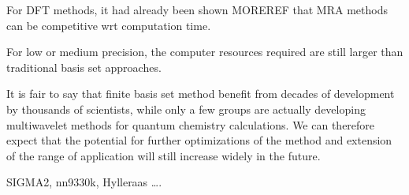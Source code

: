 \documentclass[%
 aip,
 amsmath,amssymb,
 reprint,%
]{revtex4-1}
\begin{document}

For DFT methods, it had already been shown \cite{bischoff2019} MOREREF that MRA methods can be competitive wrt computation time.

For low or medium precision, the computer resources required are still larger than traditional basis set approaches. 


It is fair to say that finite basis set method benefit from decades of development by thousands of scientists, while only a few groups are actually developing multiwavelet methods for quantum chemistry calculations. We can therefore expect that the potential for further optimizations of the method and extension of the range of application will still increase widely in the future.



\begin{acknowledgments}
SIGMA2, nn9330k, Hylleraas \dots.
\end{acknowledgments}




%
%





\end{document}
